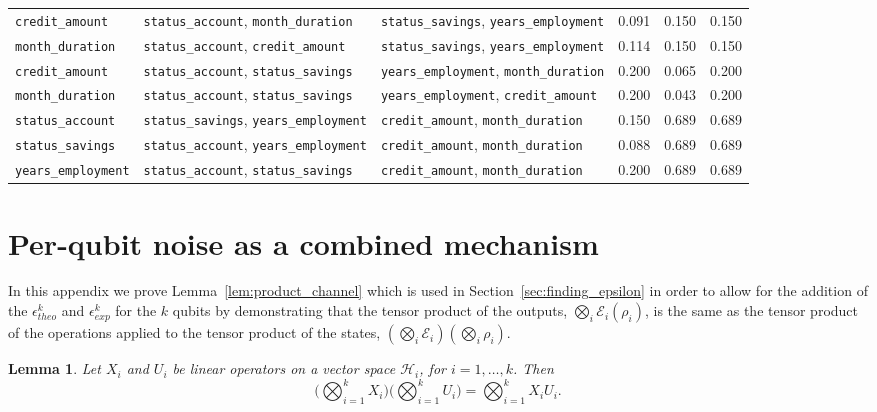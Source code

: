 \documentclass{ieeeaccess}
\newtheorem{lemma}{Lemma}[section]
\begin{document}
\begin{table}[htbp]
\begin{tabular}{@{}lllrrr@{}}
    \texttt{credit\_amount} & \texttt{status\_account}, \texttt{month\_duration} & \texttt{status\_savings}, \texttt{years\_employment} & 0.091 & 0.150 & 0.150 \\
    \texttt{month\_duration} & \texttt{status\_account}, \texttt{credit\_amount} & \texttt{status\_savings}, \texttt{years\_employment} & 0.114 & 0.150 & 0.150 \\
    \texttt{credit\_amount} & \texttt{status\_account}, \texttt{status\_savings} & \texttt{years\_employment}, \texttt{month\_duration} & 0.200 & 0.065 & 0.200 \\
    \texttt{month\_duration} & \texttt{status\_account}, \texttt{status\_savings} & \texttt{years\_employment}, \texttt{credit\_amount} & 0.200 & 0.043 & 0.200 \\
    \texttt{status\_account} & \texttt{status\_savings}, \texttt{years\_employment} & \texttt{credit\_amount}, \texttt{month\_duration} & 0.150 & 0.689 & 0.689 \\
    \texttt{status\_savings} & \texttt{status\_account}, \texttt{years\_employment} & \texttt{credit\_amount}, \texttt{month\_duration} & 0.088 & 0.689 & 0.689 \\
    \texttt{years\_employment} & \texttt{status\_account}, \texttt{status\_savings} & \texttt{credit\_amount}, \texttt{month\_duration} & 0.200 & 0.689 & 0.689 \\
    \bottomrule
  \end{tabular}
\end{table}

\section{Per-qubit noise as a combined mechanism}
\label{ap:composition_proof}

In this appendix we prove Lemma~\ref{lem:product_channel} which is used in Section~\ref{sec:finding_epsilon} in order to allow for the addition of the $\epsilon_{theo}^{k}$ and $\epsilon_{exp}^{k}$ for the $k$ qubits by demonstrating that the tensor product of the outputs, $\bigotimes_i\mathcal{E}_i(\rho_i)$, is the same as the tensor product of the operations applied to the tensor product of the states, $(\bigotimes_{i}\mathcal{E}_i)(\bigotimes_{i}\rho_i)$.

\begin{lemma}
  Let $X_i$ and $U_i$ be linear operators on a vector space $\mathcal{H}_i$, for $i = 1, \dots, k$. Then
  \[
    \Big(\bigotimes_{i=1}^{k} X_i\Big)\Big(\bigotimes_{i=1}^{k} U_i\Big) = \bigotimes_{i=1}^{k} X_i U_i.
  \]
  \label{lem:mixed_product}
\end{lemma}
\end{document}
